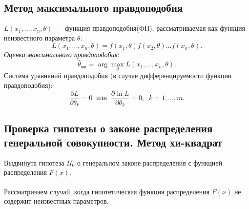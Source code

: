 \documentclass[a4paper]{article}
\begin{document}
\subsection{Метод максимального правдоподобия}
$L(x_1,...,x_n,\theta)\;-$ функция правдоподобия(ФП), рассматриваемая как функция неизвестного параметра $\theta$:
\begin{equation}
    L(x_1,...,x_n,\theta)=f(x_1,\theta)f(x_2,\theta)...f(x_n,\theta).
\end{equation}
\textit{Оценка максимального правдоподобия}:
\begin{equation}
    \widehat{\theta}_{\text{мп}}=\arg{\max_\theta{L(x_1,...,x_n,\theta)}}.
\end{equation}
Система уравнений правдоподобия (в случае дифференцируемости функции правдоподобия):
\begin{equation}
    \frac{\partial L}{\partial\theta_k}=0\;\;\text{или}\;\;\frac{\partial\ln{L}}{\partial\theta_k}=0,\;\;k=1,...,m.
\end{equation}
\subsection{Проверка гипотезы о законе распределения генеральной совокупности. Метод хи-квадрат}
Выдвинута гипотеза $H_0$ о генеральном законе распределения с функцией
распределения $F(x)$.\\\\
Рассматриваем случай, когда гипотетическая функция распределения $F(x)$ не содержит неизвестных параметров.
\end{document}
